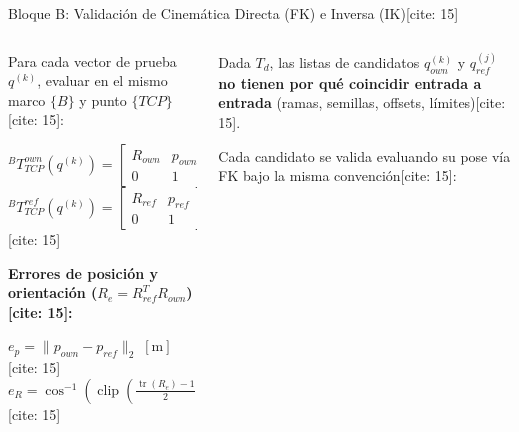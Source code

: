 \documentclass[aspectratio=169, xcolor={table,xcdraw}]{beamer}
\begin{document}
\begin{frame}{Bloque B: Validación de Cinemática Directa (FK) e Inversa (IK)[cite: 15]}
    \begin{columns}[T]
        \begin{column}{0.48\textwidth}
            \begin{tcolorbox}[colback=white, colframe=ucbblue, title=\textbf{1. Cinemática Directa (FK)} {[cite: 15]}, boxsep=0.8mm, top=1mm, bottom=1mm]
                \scriptsize\raggedright
                Para cada vector de prueba $q^{(k)}$, evaluar en el mismo marco $\{B\}$ y punto $\{TCP\}$[cite: 15]:
                \begin{center}
                    ${}^BT_{TCP}^{own}(q^{(k)})=\begin{bmatrix}R_{own}&p_{own}\\0&1\end{bmatrix}$ \\[4pt]
                    ${}^BT_{TCP}^{ref}(q^{(k)})=\begin{bmatrix}R_{ref}&p_{ref}\\0&1\end{bmatrix}$[cite: 15]
                \end{center}
                \textbf{Errores de posición y orientación ($R_e = R_{ref}^T R_{own}$)[cite: 15]:}
                \begin{center}
                    $\boxed{ e_p = \|p_{own} - p_{ref}\|_2 \; [\mathrm{m}] }$[cite: 15] \\[4pt]
                    $\boxed{ e_R = \cos^{-1}\!\left(\operatorname{clip}\!\left(\frac{\operatorname{tr}(R_e)-1}{2}, -1, 1\right)\right) }$[cite: 15]
                \end{center}
            \end{tcolorbox}
        \end{column}
        \begin{column}{0.48\textwidth}
            \begin{tcolorbox}[colback=white, colframe=ucbblue, title=\textbf{2. Cinemática Inversa (IK)} {[cite: 15]}, boxsep=0.8mm, top=1mm, bottom=1mm]
                \scriptsize\raggedright
                Dada $T_d$, las listas de candidatos $q^{(k)}_{own}$ y $q^{(j)}_{ref}$ \textbf{no tienen por qué coincidir entrada a entrada} (ramas, semillas, offsets, límites)[cite: 15].
                \vspace{0.15cm}
                \par Cada candidato se valida evaluando su pose vía FK bajo la misma convención[cite: 15]:

\end{tcolorbox}
\end{column}
\end{columns}
\end{frame}
\end{document}
